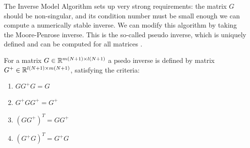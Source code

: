 The Inverse Model Algorithm sets up very strong requirements: the matrix $G$ should be non-singular, and its condition number must be small enough we can compute a numerically stable inverse. 
We can modify this algorithm by taking the Moore-Penrose inverse. This is the so-called pseudo inverse, which is uniquely defined and can be computed for all matrices \cite{LAAG}. 

\begin{defi}
	For a matrix $G \in {\mathbb{R}}^{m(N+1) \times l(N+1)}$ a psedo inverse is defined by matrix $G^+ \in {\mathbb{R}}^{l(N+1) \times m(N+1)}$, satisfying the criteria: 
	\begin{enumerate}
		\item $G G^+ G  = G $
		\item $G^+ G G^+ = G^+$
		\item $(G G^+)^T = G G^+$
		\item $(G^+ G)^T = G^+ G$
	\end{enumerate}
\end{defi}



